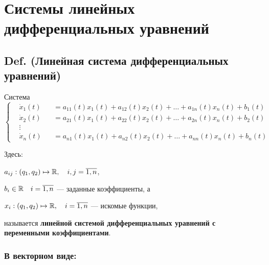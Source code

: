 \section{Системы линейных дифференциальных
уравнений}\label{ux441ux438ux441ux442ux435ux43cux44b-ux43bux438ux43dux435ux439ux43dux44bux445-ux434ux438ux444ux444ux435ux440ux435ux43dux446ux438ux430ux43bux44cux43dux44bux445-ux443ux440ux430ux432ux43dux435ux43dux438ux439}

\subsection{Def. (Линейная система дифференциальных
уравнений)}\label{def.-ux43bux438ux43dux435ux439ux43dux430ux44f-ux441ux438ux441ux442ux435ux43cux430-ux434ux438ux444ux444ux435ux440ux435ux43dux446ux438ux430ux43bux44cux43dux44bux445-ux443ux440ux430ux432ux43dux435ux43dux438ux439}

Система \[
\left\{ \begin{aligned}
  & \dot x_1(t) &&= a_{1 1}(t) x_1(t) + a_{1 2}(t) x_2(t) + \ldots + a_{1 n}(t) x_n(t) + b_1(t) \\
  & \dot x_2(t) &&= a_{2 1}(t) x_1(t) + a_{2 2}(t) x_2(t) + \ldots + a_{2 n}(t) x_n(t) + b_2(t) \\
  & \vdots && \\
  & \dot x_n(t) &&= a_{n 1}(t) x_1(t) + a_{n 2}(t) x_2(t) + \ldots + a_{n n}(t) x_n(t) + b_n(t)
\end{aligned} \right.
\]

Здесь:

\(a_{i j} : (q_1, q_2) \mapsto \mathbb R, \quad i,j = \overline{1,n}\),

\(b_i \in \mathbb R \quad i=\overline{1,n}\) --- заданные коэффициенты, а

\(x_i : (q_1, q_2) \mapsto \mathbb R, \quad i=\overline{1,n}\) --- искомые
функции,

называется \textbf{линейной системой дифференциальных уравнений с
переменными коэффициентами}.

\subsubsection{В векторном
виде:}\label{ux432-ux432ux435ux43aux442ux43eux440ux43dux43eux43c-ux432ux438ux434ux435}

